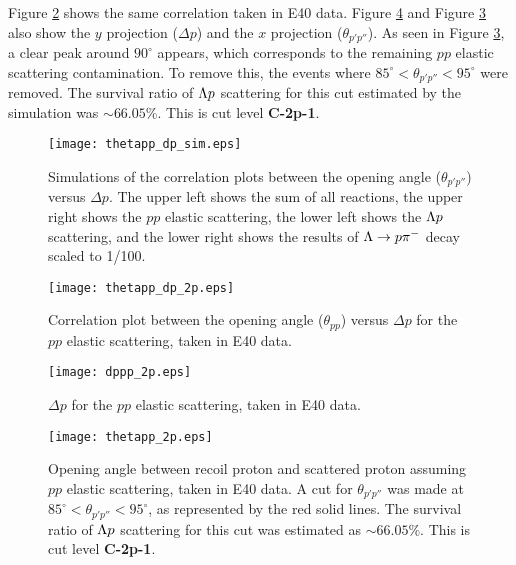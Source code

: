 Figure \ref{fig-thetapp_dp} shows the same correlation taken in E40 data. Figure \ref{fig-dp_pp} and Figure \ref{fig-thetapp} also show the $y$ projection ($\Delta p$) and the $x$ projection ($\theta_{p'p''}$). As seen in Figure \ref{fig-thetapp}, a clear peak around $90^{\circ}$ appears, which corresponds to the remaining $pp$ elastic scattering contamination. To remove this, the events where $85^{\circ} < \theta_{p'p''} < 95^{\circ}$ were removed. The survival ratio of $\Lambda p$ scattering for this cut estimated by the simulation was $\sim66.05\%$. This is cut level {\bf C-2p-1}.


\begin{figure}[h]
  \centering
  \texttt{[image: thetapp\_dp\_sim.eps]}
  \caption{Simulations of the correlation plots between the opening angle ($\theta_{p'p''}$) versus $\Delta p$. The upper left shows the sum of all reactions, the upper right shows the $pp$ elastic scattering, the lower left shows the $\Lambda p$ scattering, and the lower right shows the results of $\Lambda\to p\pi^{-}$ decay scaled to 1/100. }
  \label{fig-thetapp_dp_sim}
\end{figure}

\begin{figure}[!h]
  \centering
  \texttt{[image: thetapp\_dp\_2p.eps]}
  \caption{Correlation plot between the opening angle ($\theta_{pp}$) versus $\Delta p$ for the $pp$ elastic scattering, taken in E40 data.}
   \label{fig-thetapp_dp}
\end{figure}

\begin{figure}[!h]
  \centering
  \texttt{[image: dppp\_2p.eps]}
  \caption{$\Delta p$ for the $pp$ elastic scattering, taken in E40 data.}
   \label{fig-thetapp}
\end{figure}

\begin{figure}[!h]
  \centering
  \texttt{[image: thetapp\_2p.eps]}
  \caption{Opening angle between recoil proton and scattered proton assuming $pp$ elastic scattering, taken in E40 data. A cut for $\theta_{p'p''}$ was made at $85^{\circ} < \theta_{p'p''} < 95^{\circ}$, as represented by the red solid lines. The survival ratio of $\Lambda p$ scattering for this cut was estimated as $\sim66.05\%$. This is cut level {\bf C-2p-1}.}
   \label{fig-dp_pp}
\end{figure}

